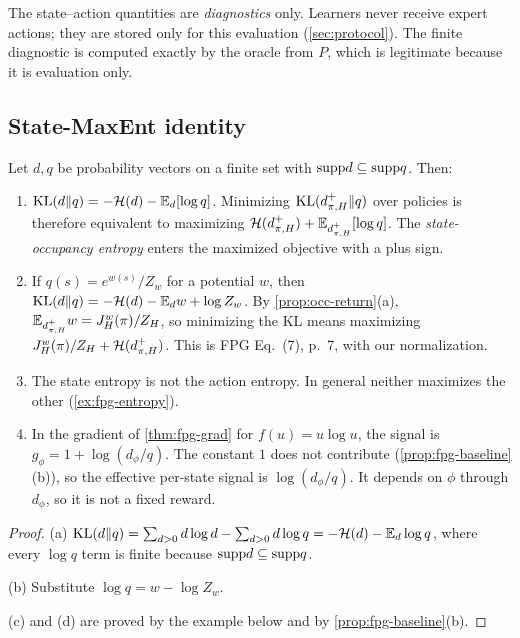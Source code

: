 \begin{remark}
The state--action quantities are \emph{diagnostics} only.
Learners never receive expert actions; they are stored only for this evaluation (\cref{sec:protocol}).
The finite diagnostic is computed exactly by the oracle from $P$, which is legitimate because it is evaluation only.
\end{remark}

\subsection{State-MaxEnt identity}\label{sec:fpg-maxent}

\begin{proposition}\label{prop:fpg-maxent}
Let $d,q$ be probability vectors on a finite set with $\mathrm{supp} d\subseteq\mathrm{supp} q$. Then:
\begin{enumerate}[nosep,label=(\alph*)]
\item $\mathrm{KL}(d\Vert q)=-\mathcal{H}(d)-\mathbb{E}_d[\log q]$. Minimizing $\mathrm{KL}(d^+_{\pi,H}\Vert q)$ over policies is therefore equivalent to maximizing $\mathcal{H}(d^+_{\pi,H})+\mathbb{E}_{d^+_{\pi,H}}[\log q]$. The \emph{state-occupancy entropy} enters the maximized objective with a plus sign.
\item If $q(s)=e^{w(s)}/Z_w$ for a potential $w$, then $\mathrm{KL}(d\Vert q)=-\mathcal{H}(d)-\mathbb{E}_dw+\log Z_w$. By \cref{prop:occ-return}(a), $\mathbb{E}_{d^+_{\pi,H}}w=J^w_H(\pi)/Z_H$, so minimizing the KL means maximizing $J^w_H(\pi)/Z_H+\mathcal{H}(d^+_{\pi,H})$. This is FPG Eq.~(7), p.~7, with our normalization.
\item The state entropy is not the action entropy. In general neither maximizes the other (\cref{ex:fpg-entropy}).
\item In the gradient of \cref{thm:fpg-grad} for $f(u)=u\log u$, the signal is $g_\phi=1+\log(d_\phi/q)$. The constant $1$ does not contribute (\cref{prop:fpg-baseline}(b)), so the effective per-state signal is $\log(d_\phi/q)$. It depends on $\phi$ through $d_\phi$, so it is not a fixed reward.
\end{enumerate}
\end{proposition}
\begin{proof}
(a) $\mathrm{KL}(d\Vert q)=\sum_{d>0}d\log d-\sum_{d>0}d\log q=-\mathcal{H}(d)-\mathbb{E}_d\log q$, where every $\log q$ term is finite because $\mathrm{supp} d\subseteq\mathrm{supp} q$.

(b) Substitute $\log q=w-\log Z_w$.

(c) and (d) are proved by the example below and by \cref{prop:fpg-baseline}(b).
\end{proof}

